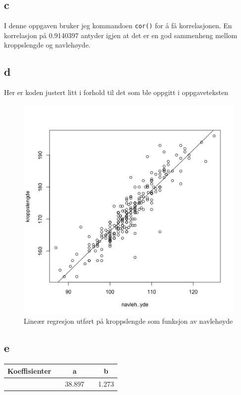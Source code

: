 \subsection*{c}
I denne oppgaven bruker jeg kommandoen \texttt{cor()} for å få korrelasjonen. En korrelasjon på 0.9140397 antyder igjen at det er en god sammenheng mellom kroppslengde og navlehøyde.

\subsection*{d}
Her er koden justert litt i forhold til det som ble oppgitt i oppgaveteksten

\begin{figure}[H]
        \centering
        \includegraphics[width=0.9\linewidth]{3D.pdf}
        \caption{Lineær regresjon utført på kroppslengde som funksjon av navlehøyde}
        \label{fig:3D}
\end{figure}


\subsection*{e}

\begin{center}
\label{tab:e}
\begin{tabularx}{\textwidth}{c X c X c }
    \hline
    \hline
        Koeffisienter && a && b\\
    \hline
                    && 38.897 && 1.273\\
    \hline
\end{tabularx}
\end{center}

